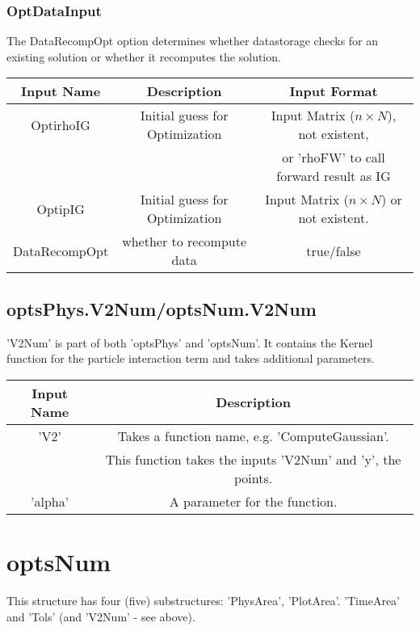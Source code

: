 \documentclass[11pt, a4paper]{article}
\theoremstyle{definition}
\begin{document}
\subsubsection*{OptDataInput}
The DataRecompOpt option determines whether datastorage checks for an existing solution or whether it recomputes the solution.
\begin{center}
	\begin{tabular}{ | c | c | c |}
		\hline
		Input Name & Description  & Input Format  \\ 
		\hline
		OptirhoIG & Initial guess for Optimization & Input Matrix ($n \times N$), not existent, \\
		& & or 'rhoFW' to call forward result as IG\\
		\hline
		OptipIG &  Initial guess for Optimization & Input Matrix ($n \times N$) or not existent. \\
		\hline
		DataRecompOpt & whether to recompute data & true/false\\
		\hline
	\end{tabular}
\end{center}



\subsection{optsPhys.V2Num/optsNum.V2Num}
'V2Num' is part of both 'optsPhys' and 'optsNum'. It contains the Kernel function for the particle interaction term and takes additional parameters.
\begin{center}
	\begin{tabular}{ |c| c | }
		\hline
		Input Name &  Description \\ 
		\hline
		'V2' & Takes a function name, e.g. 'ComputeGaussian'. \\
		 & This function takes the inputs 'V2Num' and 'y', the points.\\ 
		'alpha' & A parameter for the function. \\
		\hline 
	\end{tabular}
\end{center}	
	
\section{optsNum}	

This structure has four (five) substructures: 'PhysArea', 'PlotArea'. 'TimeArea' and 'Tols'	(and 'V2Num' - see above).
\end{document}
